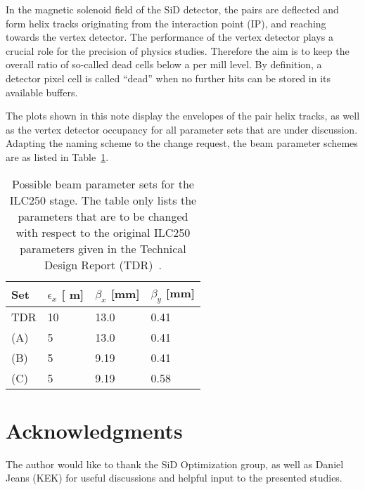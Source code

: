\documentclass[12pt]{article}
\newcommand{\murm}{%
  \ifmmode
    \mathchoice
        {\hbox{\normalsize\textmu}}
        {\hbox{\normalsize\textmu}}
        {\hbox{\scriptsize\textmu}}
        {\hbox{\tiny\textmu}}%
  \else
    \textmu
  \fi
}
\begin{document}
In the magnetic solenoid field of the SiD detector, the pairs are deflected and form helix tracks originating from the interaction point (IP), and reaching towards the vertex detector.
The performance of the vertex detector plays a crucial role for the precision of physics studies.
Therefore the aim is to keep the overall ratio of so-called dead cells below a per mill level.
By definition, a detector pixel cell is called ``dead'' when no further hits can be stored in its available buffers. 

The plots shown in this note display the envelopes of the pair helix tracks, as well as the vertex detector occupancy for all parameter sets that are under discussion.
Adapting the naming scheme to the change request, the beam parameter schemes are as listed in Table~\ref{tab:Parameters}.
\begin{table}
\caption{Possible beam parameter sets for the ILC250 stage. The table only lists the parameters that are to be changed with respect to the original ILC250 parameters given in the Technical Design Report (TDR)~\cite[p. 11]{TDR1}.}
\label{tab:Parameters}
\centering
\begin{tabularx}{0.55\textwidth}{llll}
\hline\hline
\textbf{Set}  & \textbf{$\epsilon_x$ [\murm m]} & \textbf{$\beta_x$ [mm]} & \textbf{$\beta_y$ [mm]}\\
\hline
\cline{1-4}
\hline
 TDR & 10 & 13.0 & 0.41\\
 (A) & 5 & 13.0 & 0.41\\
 (B) & 5 & 9.19 & 0.41\\
 (C) & 5 & 9.19 & 0.58\\
\hline\hline
\end{tabularx}
\end{table}


%
%


\section*{Acknowledgments}
The author would like to thank the SiD Optimization group, as well as Daniel Jeans (KEK) for useful discussions and helpful input to the presented studies.

%




\end{document}
